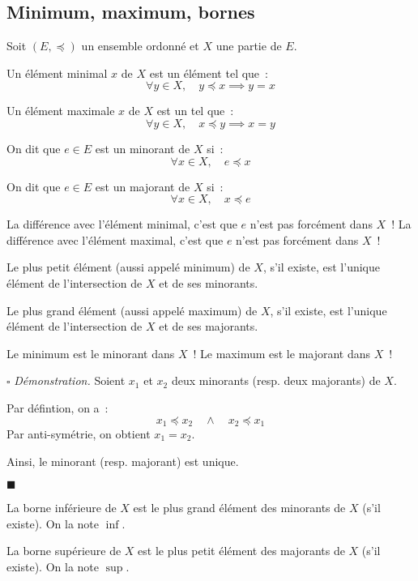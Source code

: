 \documentclass[a4paper, titlepage]{article}
\renewenvironment{proof}{\par$\square$ \footnotesize\textit{Démonstration.}}{\begin{flushright}$\blacksquare$\end{flushright}\par}
\begin{document}
    \subsection{Minimum, maximum, bornes}
    \begin{defn}
        Soit $(E,\preceq)$ un ensemble ordonné et $X$ une partie de $E$.

        Un élément minimal $x$ de $X$ est un élément tel que~:
        $$ \forall y\in X,\quad y\preceq x\implies y=x $$

        Un élément maximale $x$ de $X$ est un tel que~:
        $$ \forall y\in X,\quad x \preceq y \implies x=y $$
    \end{defn}
    \begin{defn}
        On dit que $e\in E$ est un minorant de $X$ si~:
        $$ \forall x\in X,\quad e\preceq x $$

        On dit que $e\in E$ est un majorant de $X$ si~:
        $$ \forall x\in X,\quad x\preceq e $$
    \end{defn}
    La différence avec l'élément minimal, c'est que $e$ n'est pas forcément dans $X$~!
    La différence avec l'élément maximal, c'est que $e$ n'est pas forcément dans $X$~!
    \begin{defn}
        Le plus petit élément (aussi appelé minimum) de $X$, s'il existe, est l'unique élément de l'intersection de $X$
        et de ses minorants.

        Le plus grand élément (aussi appelé maximum) de $X$, s'il existe, est l'unique élément de l'intersection de $X$
        et de ses majorants.
    \end{defn}
    Le minimum est le minorant dans $X$~!
    Le maximum est le majorant dans $X$~!

    \begin{proof}
        Soient $x_1$ et $x_2$ deux minorants (resp. deux majorants) de $X$.

        Par défintion, on a~:
        $$ x_1\preceq x_2\quad\land\quad x_2\preceq x_1$$
        Par anti-symétrie, on obtient $x_1=x_2$.

        Ainsi, le minorant (resp. majorant) est unique.
    \end{proof}

    \begin{defn}
        La borne inférieure de $X$ est le plus grand élément des minorants de $X$ (s'il existe).
        On la note $\inf$.

        La borne supérieure de $X$ est le plus petit élément des majorants de $X$ (s'il existe).
        On la note $\sup$.
    \end{defn}
\end{document}
